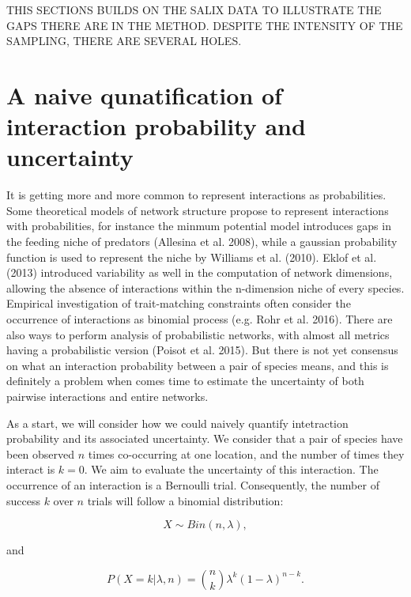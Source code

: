 \documentclass[12pt]{article}
\begin{document}
THIS SECTIONS BUILDS ON THE SALIX DATA TO ILLUSTRATE THE GAPS THERE ARE IN THE METHOD. DESPITE THE INTENSITY OF THE SAMPLING, THERE ARE SEVERAL HOLES.



\section*{A naive qunatification of interaction probability and uncertainty}

It is getting more and more common to represent interactions as probabilities. Some theoretical models of network structure propose to represent interactions with probabilities, for instance the minmum potential model introduces gaps in the feeding niche of predators (Allesina et al. 2008), while a gaussian probability function is used to represent the niche by Williams et al. (2010). Eklof et al. (2013) introduced variability as well in the computation of network dimensions, allowing the absence of interactions within the n-dimension niche of every species. Empirical investigation of trait-matching constraints often consider the occurrence of interactions as binomial process (e.g. Rohr et al. 2016). There are also ways to perform analysis of probabilistic networks, with almost all metrics having a probabilistic version (Poisot et al. 2015). But there is not yet consensus on what an interaction probability between a pair of species means, and this is definitely a problem when comes time to estimate the uncertainty of both pairwise interactions and entire networks. 

As a start, we will consider how we could naively quantify intetraction probability and its associated uncertainty. We consider that a pair of species have been observed $n$ times co-occurring at one location, and the number of times they interact is $k = 0$. We aim to evaluate the uncertainty of this interaction. The occurrence of an interaction is a Bernoulli trial. Consequently, the number of success $k$ over $n$ trials will follow a binomial distribution: 
    
    \begin{equation}
      X \sim Bin(n,\lambda) ,
    \end{equation}

    \noindent and 

    \begin{equation}
       P(X = k|\lambda,n) = {n \choose k}\lambda^k(1-\lambda)^{n-k} . 
       \label{likelihood}
    \end{equation}
\end{document}
